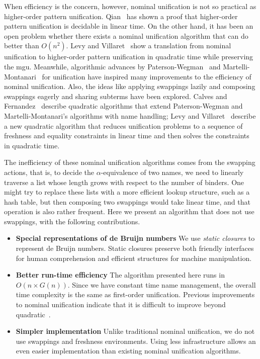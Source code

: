 \documentclass[a4paper,UKenglish]{lipics-v2016}
\begin{document}
When efficiency is the concern, however, nominal unification is not so practical as higher-order pattern unification.
Qian~\cite{qian_unification_1996} has shown a proof that higher-order pattern unification is decidable in linear time.
On the other hand, it has been an open problem
whether there exists a nominal unification algorithm
that can do better than $O(n^2)$.
Levy and Villaret~\cite{levy_nominal_2012} show a translation from nominal unification to higher-order pattern unification
in quadratic time while preserving the mgu.
Meanwhile, algorithmic advances by Paterson-Wegman~\cite{paterson_linear_1978} and Martelli-Montanari~\cite{martelli_efficient_1982} for unification
have inspired many improvements to the efficiency of nominal unification.
Also, the ideas like applying swappings lazily and composing swappings eagerly and sharing subterms have been explored.
Calves and Fernandez~\cite{calves_polynomial_2008, calves_complexity_2010, calves_first-order_2010}
describe quadratic
algorithms that extend Paterson-Wegman and Martelli-Montanari's
algorithms with name handling; Levy and
Villaret~\cite{levy_efficient_2010} describe a new quadratic algorithm
that reduces unification problems to a sequence of freshness and
equality constraints in linear time and then solves the constraints in quadratic time.

The inefficiency of these nominal unification algorithms
comes from the swapping actions, that is,
to decide the $\alpha$-equivalence of two names,
we need to linearly traverse a list
whose length grows with respect to the number of binders.
One might try to replace these lists with a more efficient lookup
structure, such as a hash table,
but then composing two swappings would take linear time,
and that operation is also rather frequent.
Here we present an algorithm that does not use swappings,
with the following contributions.

\begin{itemize}
\item \textbf{Special representations of de Bruijn numbers}
  We use \textit{static closures} to represent de Bruijn numbers.
  Static closures preserve both friendly interfaces for human comprehension
  and efficient structures for machine manipulation.
  
\item \textbf{Better run-time efficiency}
  The algorithm presented here runs in $O(n \times G(n))$.
  Since we have constant time name management,
  the overall time complexity is the same as first-order unification.
  Previous improvements to nominal unification indicate
  that it is difficult to improve beyond quadratic~\cite
  {calves_polynomial_2008, calves_complexity_2010, calves_first-order_2010, levy_efficient_2010}.

\item \textbf{Simpler implementation}
  Unlike traditional nominal unification,
  we do not use swappings and freshness environments.
  Using less infrastructure allows an even easier implementation
  than existing nominal unification algorithms.

 \end{itemize} 
\end{document}
